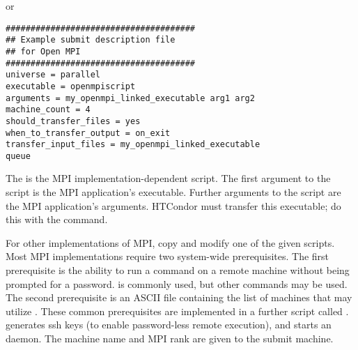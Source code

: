 or

\begin{verbatim}
######################################
## Example submit description file
## for Open MPI
######################################
universe = parallel
executable = openmpiscript
arguments = my_openmpi_linked_executable arg1 arg2
machine_count = 4
should_transfer_files = yes
when_to_transfer_output = on_exit
transfer_input_files = my_openmpi_linked_executable
queue
\end{verbatim}

The  is the MPI implementation-dependent script.
The first argument to the script is the MPI application's 
executable.
Further arguments to the script are the MPI application's arguments.
HTCondor must transfer this executable;
do this with the  command.

For other implementations of MPI,
copy and modify one of the given scripts.
Most MPI implementations require two system-wide prerequisites.
The first prerequisite is the ability to run a command
on a remote machine without being prompted for a password.
 is commonly used, but other
commands may be used.
The second prerequisite is an ASCII file containing the
list of machines that may utilize .
These common prerequisites are implemented in a further script
called .
 generates ssh keys 
(to enable password-less remote execution),
and starts an  daemon.
The machine name and MPI rank are given to the submit machine.



